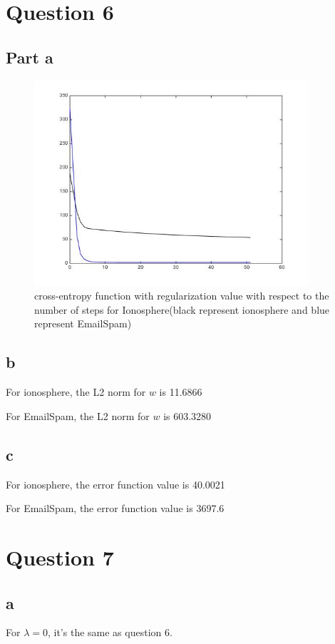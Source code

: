 \documentclass[11pt]{article}
\numberwithin{equation}{section}
\begin{document}
\section{Question 6}
	\subsection{Part a}
	\begin{figure} [H]
    	\centering 
    	\includegraphics[width=4in]{Q6(a)} 
    	\caption{cross-entropy function with regularization value with respect to the number of steps for Ionosphere(black represent ionosphere and blue represent EmailSpam)} 
    	\label{fig:side:a} 
	\end{figure}
	\subsection{b}
	For ionosphere, the L2 norm for $w$ is 11.6866 
	
	For EmailSpam, the L2 norm for $w$ is 603.3280
	\subsection{c}
	For ionosphere, the error function value is 40.0021
	
	For EmailSpam, the error function value is 3697.6
\section{Question 7}
	\subsection{a}
	For $\lambda = 0$, it's the same as question 6.
	
\end{document}
